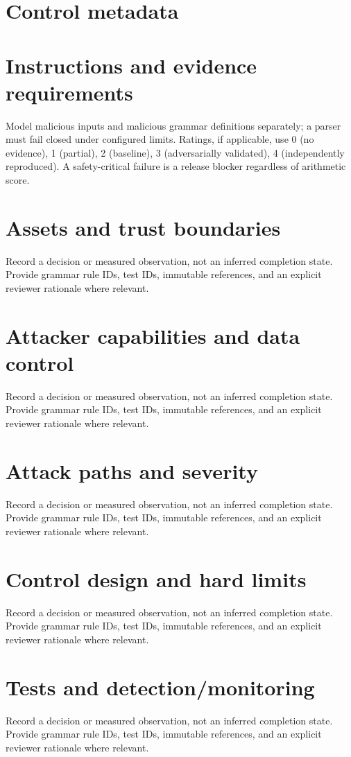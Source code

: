 \documentclass[11pt,letterpaper]{article}
\begin{document}
\makedoctitle\makedocsummary
\tableofcontents\clearpage
\section{Control metadata}
\section{Instructions and evidence requirements}
Model malicious inputs and malicious grammar definitions separately; a parser must fail closed under configured limits. Ratings, if applicable, use 0 (no evidence), 1 (partial), 2 (baseline), 3 (adversarially validated), 4 (independently reproduced). A safety-critical failure is a release blocker regardless of arithmetic score.
\section{Assets and trust boundaries}
Record a decision or measured observation, not an inferred completion state. Provide grammar rule IDs, test IDs, immutable references, and an explicit reviewer rationale where relevant.
\section{Attacker capabilities and data control}
Record a decision or measured observation, not an inferred completion state. Provide grammar rule IDs, test IDs, immutable references, and an explicit reviewer rationale where relevant.
\section{Attack paths and severity}
Record a decision or measured observation, not an inferred completion state. Provide grammar rule IDs, test IDs, immutable references, and an explicit reviewer rationale where relevant.
\section{Control design and hard limits}
Record a decision or measured observation, not an inferred completion state. Provide grammar rule IDs, test IDs, immutable references, and an explicit reviewer rationale where relevant.
\section{Tests and detection/monitoring}
Record a decision or measured observation, not an inferred completion state. Provide grammar rule IDs, test IDs, immutable references, and an explicit reviewer rationale where relevant.
\end{document}
